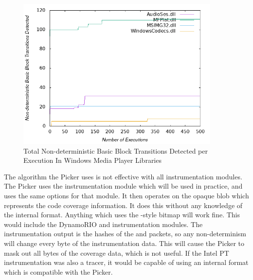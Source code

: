 \begin{figure}[htb]
\centering
\includegraphics[width=4in]{picker.png}
\caption{Total Non-deterministic Basic Block Transitions Detected per Execution In Windows Media Player Libraries}
\label{fig:picker}
\end{figure}

The algorithm the Picker uses is not effective with all instrumentation
modules. The Picker uses the instrumentation module which will be used in
practice, and uses the same options for that module. It then operates on
the opaque blob which represents the code coverage information.  It does
this without any knowledge of the internal format.  Anything which uses the
\AFL{}-style bitmap will work fine.  This would include the DynamoRIO and
\AFL{} instrumentation modules. The \IPT{} instrumentation output is the hashes
of the \TNT{} and \TIP{} packets, so any non-determinism will change every byte of
the instrumentation data.  This will cause the Picker to mask out all bytes of
the coverage data, which is not useful. If the Intel PT
instrumentation was also a tracer, it would be capable of using an internal
format which is compatible with the Picker.
